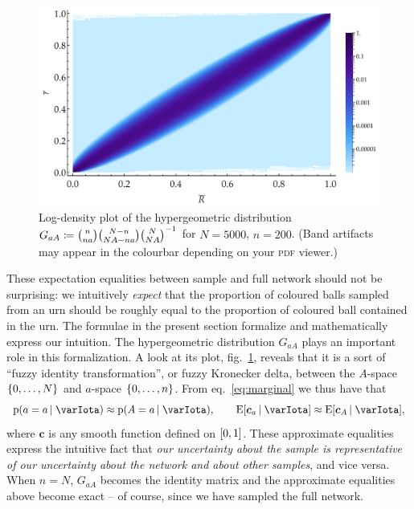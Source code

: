 \documentclass[\ifafour a4paper,12pt,\else a5paper,10pt,\fi%
onecolumn,oneside,article,%
british%
]{memoir}
\theoremstyle{remark}
\theoremstyle{innote}
\newcommand*{\defd}{\coloneqq}
\DeclarePairedDelimiter\clcl{[}{]}
\DeclarePairedDelimiter\set{\{}{\}}
\newcommand*{\pf}{\mathrm{p}}%
\newcommand*{\E}{\mathrm{E}}
\renewcommand*{\|}{\nonscript\,\vert\nonscript\;\mathopen{}}
\newcommand*{\eqn}{eq.}%
\newcommand*{\fig}{fig.}%
\newcommand*{\ypp}{G}
\newcommand*{\yAv}{A}
\newcommand*{\yav}{a}
\newcommand*{\yNv}{N}
\newcommand*{\ya}{\yav}%
\newcommand*{\yA}{\yAv}%
\newcommand*{\yH}{\varIota}
\newcommand*{\yg}{\bm{c}}
\begin{document}
\bigskip


\begin{figure}[!b]
\centering
\includegraphics[width=\linewidth]{pop_sample_projection3.pdf}%
\caption{Log-density plot of the hypergeometric distribution
  $%
\ypp_{\ya\yA} \defd  \raisebox{0pt}[0pt][1ex]{}\binom{n}{n\ya}\binom{\yNv-n}{\yNv \yA-n\ya}\binom{\yNv}{\yNv \yA}^{-1}$ for $\yNv=5000$, $n=200$. (Band artifacts may appear in the
  colourbar depending on your \textsc{pdf} viewer.)}
\label{fig:hypergeom_proj}
\end{figure}%
These expectation equalities between sample and full network should not
be surprising: we intuitively \emph{expect} that the proportion of coloured
balls sampled from an urn should be roughly equal to the proportion of
coloured ball contained in the urn. The formulae in the present section
formalize and mathematically express our intuition. The hypergeometric
distribution $\ypp_{\ya\yA}$ plays an important role in this
formalization. A look at its plot, \fig~\ref{fig:hypergeom_proj}, reveals
that it is a sort of \enquote{fuzzy identity transformation}, or fuzzy
Kronecker delta, between the $\yA$-space $\set{0,\dotsc,\yNv}$ and
$\ya$-space $\set{0,\dotsc,n}$. From \eqn~\eqref{eq:marginal} we thus have
that
\begin{equation}
  \label{eq:roughly_equal_nN}
  \pf(\ya=a \|\yH) \approx \pf(\yA=a \|\yH),\qquad
\E[\yg_{\ya} \|\yH] \approx \E[\yg_{\yA} \|\yH],
\end{equation}
where $\yg$ is any smooth function defined on $\clcl{0,1}$. These approximate
equalities express the intuitive fact that \emph{our uncertainty about the
  sample is representative of our uncertainty about the network and
  about other samples}, and vice versa. When $n=\yNv$, $\ypp_{\ya\yA}$
becomes the identity matrix and the approximate equalities above become
exact -- of course, since we have sampled the full network.
\end{document}
